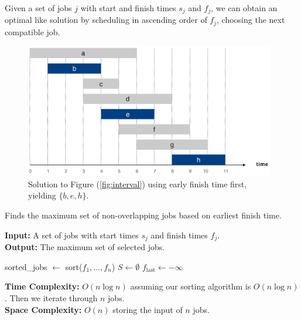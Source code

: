 \noindent
\begin{theo}
    
    Given a set of jobs $j$ with start and finish times $s_j$ and $f_j$, we can obtain an optimal like solution by scheduling in ascending order of $f_j$,
    choosing the next compatible job.
\end{theo}
\begin{figure}[h]
    \begin{center}
      \includegraphics[height=2.3in]{./Sections/sched/interval/interval_sol.png}
    \end{center}
     \caption{Solution to Figure (\ref{fig:interval}) using early finish time first, yielding $\{b,e,h\}$.}\label{fig:interval_sol}
\end{figure}

\begin{Func}
    Finds the maximum set of non-overlapping jobs based on earliest finish time.

    \vspace{.5em}
    \noindent
    \textbf{Input:} A set of jobs with start times $s_j$ and finish times $f_j$.\\
    \textbf{Output:} The maximum set of selected jobs.\\
    \begin{algorithm}[H]
        \SetAlgoLined
        sorted\_jobs $\gets$ sort($f_1, \dots, f_n$) 
        $S \gets \emptyset$ 
        $f_{\text{last}} \gets -\infty$\;

    \end{algorithm}

    \noindent
    \textbf{Time Complexity:} $O(n\log n)$ assuming our sorting algorithm is $O(n\log n)$. Then we iterate through $n$ jobs.\\
    \textbf{Space Complexity:} $O(n)$ storing the input of $n$ jobs.
\end{Func}

